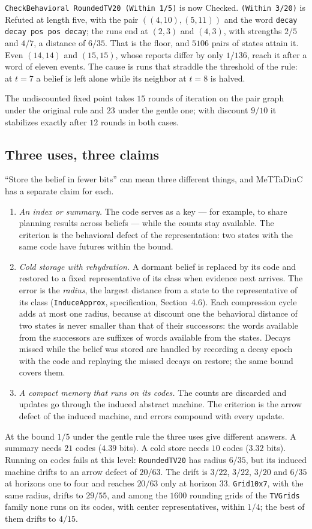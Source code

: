 \documentclass[11pt]{article}
\newcommand{\code}[1]{\texttt{#1}}
\newcommand{\spec}[1]{specification, Section~#1}
\theoremstyle{definition}
\theoremstyle{plain}
\begin{document}
\code{CheckBehavioral RoundedTV20 (Within 1/5)} is now Checked. \code{(Within 3/20)} is Refuted at
length five, with the pair $((4,10),(5,11))$ and the word \code{decay decay pos pos decay}; the
runs end at $(2,3)$ and $(4,3)$, with strengths $2/5$ and $4/7$, a distance of $6/35$. That is the
floor, and $5106$ pairs of states attain it. Even $(14,14)$ and $(15,15)$, whose reports differ
by only $1/136$, reach it after a word of eleven events. The cause is runs that straddle the
threshold of the rule: at $t=7$ a belief is left alone while its neighbor at $t=8$ is halved.

The undiscounted fixed point takes $15$ rounds of iteration on the pair graph under the original
rule and $23$ under the gentle one; with discount $9/10$ it stabilizes exactly after $12$ rounds in
both cases.

\subsection{Three uses, three claims}\label{sec:ex1uses}

``Store the belief in fewer bits'' can mean three different things, and MeTTaDinC has a separate claim
for each.
\begin{enumerate}
\item \emph{An index or summary.} The code serves as a key --- for example, to share planning
results across beliefs --- while the counts stay available. The criterion is the behavioral
defect of the representation: two states with the same code have futures within the bound.
\item \emph{Cold storage with rehydration.} A dormant belief is replaced by its code and restored
to a fixed representative of its class when evidence next arrives. The error is the
\emph{radius}, the largest distance from a state to the representative of its class
(\code{InduceApprox}, \spec{4.6}). Each compression cycle adds at most one radius, because at
discount one the behavioral distance of two states is never smaller than that of their
successors: the words available from the successors are suffixes of words available from the
states. Decays missed while the belief was stored are handled by recording a decay epoch with the
code and replaying the missed decays on restore; the same bound covers them.
\item \emph{A compact memory that runs on its codes.} The counts are discarded and updates go
through the induced abstract machine. The criterion is the arrow defect of the induced machine,
and errors compound with every update.
\end{enumerate}
At the bound $1/5$ under the gentle rule the three uses give different answers. A summary needs
$21$ codes ($4.39$ bits). A cold store needs $10$ codes ($3.32$ bits). Running on codes fails at
this level: \code{RoundedTV20} has radius $6/35$, but its induced machine drifts to an arrow defect
of $20/63$. The drift is $3/22$, $3/22$, $3/20$ and $6/35$ at horizons one to four and reaches
$20/63$ only at horizon $33$. \code{Grid10x7}, with the same radius, drifts to $29/55$, and among the
$1600$ rounding grids of the \code{TVGrids} family none runs on its codes, with center
representatives, within $1/4$; the best of them drifts to $4/15$.
\end{document}
